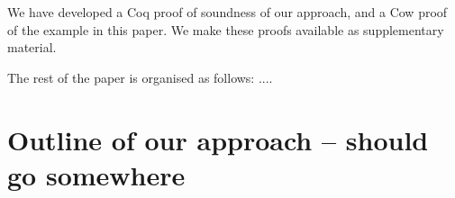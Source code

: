  We have developed a Coq proof of soundness of our approach, and a Cow proof of the
 example in this paper. We make these proofs available as supplementary material.


The rest of the paper is organised as follows: .... 


\section{Outline of our approach -- should go somewhere}

